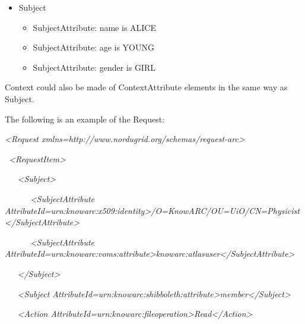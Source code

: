 \documentclass{article}
\newcommand\liststyleWWviiiNumxviii{%
\renewcommand\labelitemi{o}
\renewcommand\labelitemii{o}
\renewcommand\labelitemiii{[F0A7?]}
\renewcommand\labelitemiv{[F0B7?]}
}
\begin{document}
\liststyleWWviiiNumxviii
\begin{itemize}
\item {\color{black}
Subject}

\begin{itemize}
\item {\color{black}
SubjectAttribute: name is ALICE}
\item {\color{black}
SubjectAttribute: age is YOUNG}
\item {\color{black}
SubjectAttribute: gender is GIRL}
\end{itemize}
\end{itemize}
{\color{black}
Context could also be made of ContextAttribute elements in the same way
as Subject.}

{\color{black}
The following is an example of the Request:}

{\itshape\color{black}
{\textless}Request
xmlns={\textquotedbl}http://www.nordugrid.org/schemas/request-arc{\textquotedbl}{\textgreater}}

{\itshape\color{black}
\ {\textless}RequestItem{\textgreater}}

{\itshape\color{black}
\ \ \ {\textless}Subject{\textgreater}}

{\itshape\color{black}
\ \ \ \ \ \ {\textless}SubjectAttribute
AttributeId={\textquotedbl}urn:knowarc:x509:identity{\textquotedbl}{\textgreater}/O=KnowARC/OU=UiO/CN=Physicist{\textless}/SubjectAttribute{\textgreater}}

{\itshape\color{black}
\ \ \ \ \ \ {\textless}SubjectAttribute
AttributeId={\textquotedbl}urn:knowarc:voms:attribute{\textgreater}knowarc:atlasuser{\textless}/SubjectAttribute{\textgreater}}

{\itshape\color{black}
\ \ \ {\textless}/Subject{\textgreater}}

{\itshape\color{black}
\ \ \ {\textless}Subject
AttributeId={\textquotedbl}urn:knowarc:shibboleth:attribute{\textquotedbl}{\textgreater}member{\textless}/Subject{\textgreater}}

{\itshape\color{black}
\ \ \ {\textless}Action
AttributeId={\textquotedbl}urn:knowarc:fileoperation{\textquotedbl}{\textgreater}Read{\textless}/Action{\textgreater}}
\end{document}
